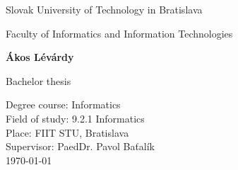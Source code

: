 \documentclass[\myFontSize,a4paper,oneside,english,hidelinks]{article}
\begin{document}
 


\begin{center}
\thispagestyle{empty}
{\Large Slovak University of Technology in Bratislava}
\par\end{center}{\Large \par}

\begin{center}
{\Large Faculty of Informatics and Information Technologies} 
\par\end{center}{\Large \par}

\smallskip{}

\vfill{}

\begin{center}
\textbf{\Large Ákos Lévárdy}
\par\end{center}{\Large \par}

\medskip{}

\begin{center}
\textbf{\Large \thesisTitle}
\par\end{center}{\Large \par}

\medskip{}

\begin{center}
{\Large Bachelor thesis}
\par\end{center}{\Large \par}

\vfill{}

\Large{
Degree course: Informatics\\ 
Field of study: 9.2.1 Informatics\\ 
Place: FIIT STU, Bratislava\\ 
Supervisor: PaedDr. Pavol Baťalík\\
\today}

%
\end{document}
